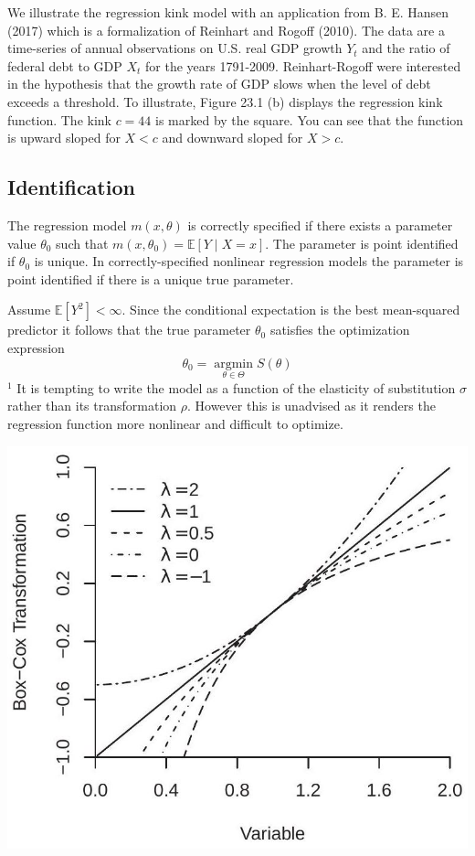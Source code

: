 \documentclass[10pt]{article}
\begin{document}
We illustrate the regression kink model with an application from B. E. Hansen (2017) which is a formalization of Reinhart and Rogoff (2010). The data are a time-series of annual observations on U.S. real GDP growth $Y_{t}$ and the ratio of federal debt to GDP $X_{t}$ for the years 1791-2009. Reinhart-Rogoff were interested in the hypothesis that the growth rate of GDP slows when the level of debt exceeds a threshold. To illustrate, Figure 23.1 (b) displays the regression kink function. The kink $c=44$ is marked by the square. You can see that the function is upward sloped for $X<c$ and downward sloped for $X>c$.

\subsection{Identification}
The regression model $m(x, \theta)$ is correctly specified if there exists a parameter value $\theta_{0}$ such that $m\left(x, \theta_{0}\right)=\mathbb{E}[Y \mid X=x]$. The parameter is point identified if $\theta_{0}$ is unique. In correctly-specified nonlinear regression models the parameter is point identified if there is a unique true parameter.

Assume $\mathbb{E}\left[Y^{2}\right]<\infty$. Since the conditional expectation is the best mean-squared predictor it follows that the true parameter $\theta_{0}$ satisfies the optimization expression
$$
\theta_{0}=\underset{\theta \in \Theta}{\operatorname{argmin}} S(\theta)
$$
${ }^{1}$ It is tempting to write the model as a function of the elasticity of substitution $\sigma$ rather than its transformation $\rho$. However this is unadvised as it renders the regression function more nonlinear and difficult to optimize.

\includegraphics[max width=\textwidth]{2022_10_23_afe6a5896d8677a5cd30g-03}
\end{document}
